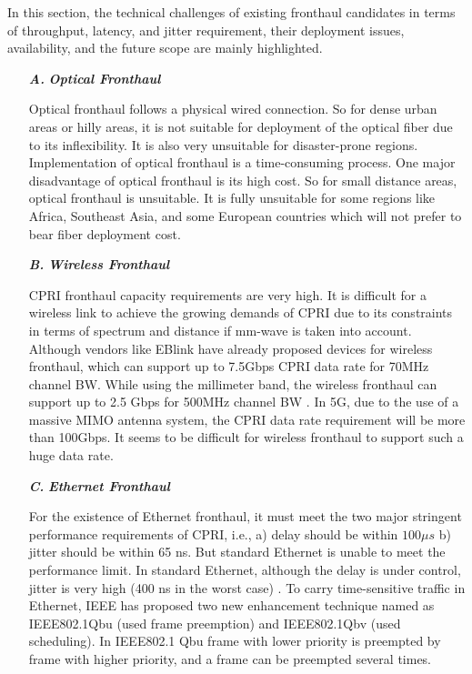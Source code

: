 \begin{multicols}{2}
In this section, the technical challenges of existing fronthaul candidates in terms of throughput, latency, and jitter requirement, their deployment issues, availability, and the future scope are mainly highlighted.

\begin{itemize}

\item[{\textit{\textbf{ A.}}}] {\textit{\textbf{Optical Fronthaul}}}

Optical fronthaul follows a physical wired connection. So for dense urban areas or hilly areas, it is not suitable for deployment of the optical fiber due to its inflexibility. It is also very unsuitable for disaster-prone regions. Implementation of optical fronthaul is a time-consuming process. One major disadvantage of optical fronthaul is its high cost. So for small distance areas, optical fronthaul is unsuitable. It is fully unsuitable for some regions like Africa, Southeast Asia, and some European countries which will not prefer to bear fiber deployment cost.

\item[{\textit{\textbf{ B.}}}] {\textit{\textbf{Wireless Fronthaul}}}

CPRI fronthaul capacity requirements are very high. It is difficult for a wireless link to achieve the growing demands of CPRI due to its constraints in terms of spectrum and distance if mm-wave is taken into account. Although vendors like EBlink have already proposed devices for wireless fronthaul, which can support up to 7.5Gbps CPRI data rate for 70MHz channel BW. While using the millimeter band, the wireless fronthaul can support up to 2.5 Gbps for 500MHz channel BW \cite{art3-key43}. In 5G, due to the use of a massive MIMO antenna system, the CPRI data rate requirement will be more than 100Gbps. It seems to be difficult for wireless fronthaul to support such a huge data rate.

\item[{\textit{\textbf{ C.}}}] {\textit{\textbf{Ethernet Fronthaul}}}

For the existence of Ethernet fronthaul, it must meet the two major stringent performance requirements of CPRI, i.e., a) delay should be within $100 \mu s$ b) jitter should be within 65 ns. But standard Ethernet is unable to meet the performance limit. In standard Ethernet, although the delay is under control, jitter is very high (400 ns in the worst case) \cite{art3-key49}. To carry time-sensitive traffic in Ethernet, IEEE has proposed two new enhancement technique named as IEEE802.1Qbu (used frame preemption) and IEEE802.1Qbv (used scheduling). In IEEE802.1 Qbu frame with lower priority is preempted by frame with higher priority, and a frame can be preempted several times.


\end{itemize}
\end{multicols}
